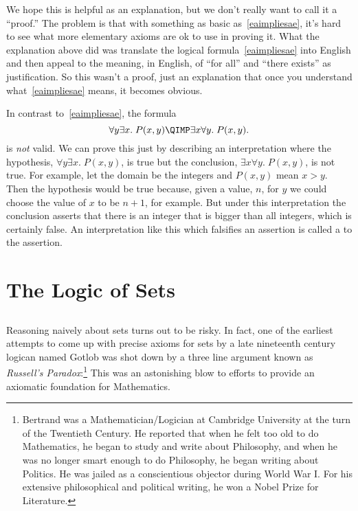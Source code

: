 We hope this is helpful as an explanation, but we don't really want to
call it a ``proof.''  The problem is that with something as basic
as~\eqref{eaimpliesae}, it's hard to see what more elementary axioms are
ok to use in proving it.  What the explanation above did was translate the
logical formula~\eqref{eaimpliesae} into English and then appeal to the
meaning, in English, of ``for all'' and ``there exists'' as justification.
So this wasn't a proof, just an explanation that once you understand
what~\eqref{eaimpliesae} means, it becomes obvious.

In contrast to~\eqref{eaimpliesae}, the formula
\begin{equation}\label{aenotimplyea}
\forall y \exists x.\; P(x,y) \QIMP \exists x \forall y.\; P(x,y).
\end{equation}
is \emph{not} valid.  We can prove this just by describing an
interpretation where the hypothesis, $\forall y \exists x.\; P(x,y)$, is
true but the conclusion, $\exists x \forall y.\; P(x,y)$, is not true.
For example, let the domain be the integers and $P(x,y)$ mean $x > y$.
Then the hypothesis would be true because, given a value, $n$, for $y$ we
could choose the value of $x$ to be $n+1$, for example.  But under this
interpretation the conclusion asserts that there is an integer that is
bigger than all integers, which is certainly false.  An interpretation
like this which falsifies an assertion is called a  to
the assertion.

\begin{problems}
\classproblems
{}
\homeworkproblems
{}
\end{problems}

\section{The Logic of Sets}

\subsection{}

Reasoning naively about sets turns out to be risky.  In fact, one of the
earliest attempts to come up with precise axioms for sets by a late
nineteenth century logican named Gotlob  was shot down by a three
line argument known as \emph{Russell's Paradox}:\footnote{Bertrand 
  was a Mathematician/Logician at Cambridge University at the turn of the
  Twentieth Century.  He reported that when he felt too old to do
  Mathematics, he began to study and write about Philosophy, and when he
  was no longer smart enough to do Philosophy, he began writing about
  Politics.  He was jailed as a conscientious objector during World War I.
  For his extensive philosophical and political writing, he won a Nobel
  Prize for Literature.}  This was an astonishing blow to efforts to
provide an axiomatic foundation for Mathematics.

